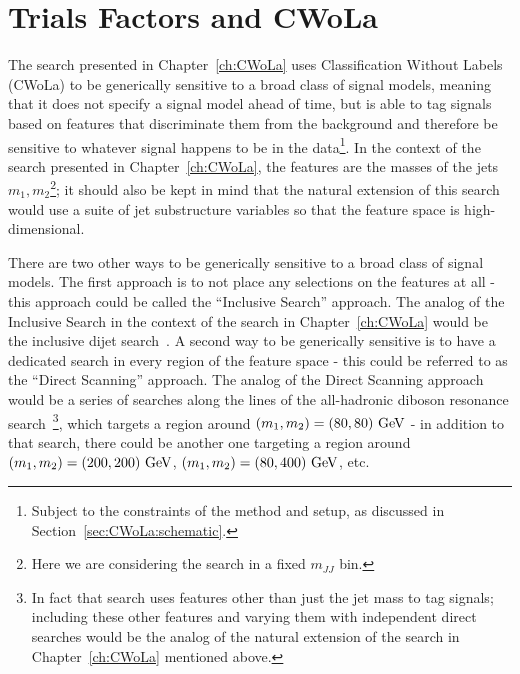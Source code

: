 \section{Trials Factors and CWoLa}
\label{app:CWoLa:trials}
The search presented in Chapter~\ref{ch:CWoLa} uses Classification Without Labels (CWoLa) to be generically sensitive to a broad class of signal models, meaning that it does not specify a signal model ahead of time, but is able to tag signals based on features that discriminate them from the background and therefore be sensitive to whatever signal happens to be in the data\footnote{Subject to the constraints of the method and setup, as discussed in Section~\ref{sec:CWoLa:schematic}.}.
In the context of the search presented in Chapter~\ref{ch:CWoLa}, the features are the masses of the jets $m_1,m_2$\footnote{Here we are considering the search in a fixed $m_{JJ}$ bin.};
it should also be kept in mind that the natural extension of this search would use a suite of jet substructure variables so that the feature space is high-dimensional.

There are two other ways to be generically sensitive to a broad class of signal models.
The first approach is to not place any selections on the features at all - this approach could be called the ``Inclusive Search'' approach.
The analog of the Inclusive Search in the context of the search in Chapter~\ref{ch:CWoLa} would be the inclusive dijet search~\cite{Aad:2019hjw}.
A second way to be generically sensitive is to have a dedicated search in every region of the feature space - this could be referred to as the ``Direct Scanning'' approach.
The analog of the Direct Scanning approach would be a series of searches along the lines of the all-hadronic diboson resonance search~\cite{Aad:2019fbh}\footnote{In fact that search uses features other than just the jet mass to tag signals; including these other features and varying them with independent direct searches would be the analog of the natural extension of the search in Chapter~\ref{ch:CWoLa} mentioned above.}, which targets a region around $(m_1,m_2)=(80,80)~\mathrm{GeV}$ - in addition to that search, there could be another one targeting a region around $(m_1,m_2)=(200,200)~\mathrm{GeV}$, $(m_1,m_2)=(80,400)~\mathrm{GeV}$, etc.

